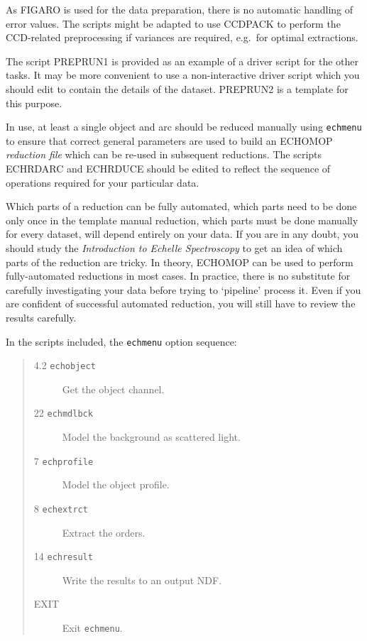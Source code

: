 \documentclass[twoside,11pt]{article}
\newcommand{\xref}[3]{#1}
\renewcommand{\_}{\texttt{\symbol{95}}}
\begin{document}
As FIGARO is used for the data preparation, there is no automatic handling of
error values.  The scripts might be adapted to use \xref{CCDPACK}{sun139}{}
to perform the CCD-related preprocessing if variances are required, e.g.\ for
optimal extractions.

The script PREPRUN1 is provided as an example of a driver script for the
other tasks.
It may be more convenient to use a non-interactive driver script which you
should edit to contain the details of the dataset.
PREPRUN2 is a template for this purpose.

In use, at least a single object and arc should be reduced manually using
{\tt echmenu} to ensure that correct general parameters are used to
build an ECHOMOP {\em reduction file} which can be re-used in subsequent
reductions.  The scripts ECHRDARC and ECHRDUCE should be edited to
reflect the sequence of operations required for your particular data.

Which parts of a reduction can be fully automated, which parts need to be
done only once in the template manual reduction, which parts must be done
manually for every dataset, will depend entirely on your data.  If you are in
any doubt, you should study the \xref{{\sl Introduction to Echelle
Spectroscopy}}{sg9}{} to get an idea of which parts of the reduction are tricky.
In theory, ECHOMOP can be used to perform fully-automated reductions in most
cases.  In practice, there is no substitute for carefully investigating your
data before trying to `pipeline' process it.  Even if you are confident of
successful automated reduction, you will still have to review the results
carefully.

In the scripts included, the \xref{{\tt echmenu}}{sun152}{ECHMENU} option
sequence:

\begin{quote}
\begin{description}

\item [4.2 \xref{{\tt ech\_object}}{sun152}{ech_spatial}]
      Get the object channel.

\item [22 \xref{{\tt ech\_mdlbck}}{sun152}{ech_mdlbck}]
      Model the background as scattered light.

\item [7 \xref{{\tt ech\_profile}}{sun152}{ech_profile}]
      Model the object profile.

\item [8 \xref{{\tt ech\_extrct}}{sun152}{ech_extrct}]
      Extract the orders.

\item [14 \xref{{\tt ech\_result}}{sun152}{ech_result}]
      Write the results to an output NDF\@.

\item [EXIT]
      Exit {\tt echmenu}.

\end{description}
\end{quote}
\end{document}
